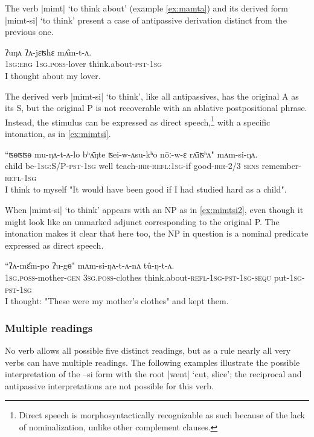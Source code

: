 \documentclass[twoside,a4paper,11pt]{article}
\newcommand{\ipa}[1]{{\phon#1}}
\begin{document}
The verb |\ipa{mimt}| `to think about' (example \ref{ex:mamta}) and its derived form |\ipa{mimt-si}| `to think' present a case of antipassive derivation distinct from the previous one. 

\begin{exe}
\ex \label{ex:mamta}
\gll
\ipa{ʔuŋʌ} 	\ipa{ʔʌ-jɛʦhɛ} 	\ipa{mʌ̂m-t-ʌ.} \\
\textsc{1sg:erg} \textsc{1sg.poss}-lover think.about-\textsc{pst-1sg} \\
\glt I thought about my lover.
\end{exe}

The derived verb |\ipa{mimt-si}| `to think', like all antipassives, has the original A as its S, but the original P is not recoverable with an ablative postpositional phrase. Instead, the stimulus can be expressed as direct speech,\footnote{Direct speech is morphosyntactically recognizable as such because of the lack of nominalization, unlike other complement clauses.} with a specific intonation, as in \ref{ex:mimtsi}.

\begin{exe}
\ex \label{ex:mimtsi}
\gll ``\ipa{ʦɵʦʦɵ}  	\ipa{mu-ŋʌ-t-ʌ-lo}  	\ipa{bʰʌ̄ŋte}  	\ipa{ʦei-w-ʌsu-kʰo}  	\ipa{nōː-w-ɛ}  	\ipa{rʌ̄iʦʰʌ}"  	\ipa{mʌm-si-ŋʌ.}  \\
child be-\textsc{1sg:S/P-pst-1sg} well teach-\textsc{irr-refl:1sg}-if good-\textsc{irr-2/3} \textsc{sens} remember-\textsc{refl-1sg} \\
\glt  I think to myself "It would have been good if I had studied hard as a child".
\end{exe}

When |\ipa{mimt-si}| `to think' appears with an NP as in  \ref{ex:mimtsi2}, even though it might look like an unmarked adjunct corresponding to the original P. The intonation makes it clear that here too, the NP in question is a nominal predicate expressed as direct speech.

\begin{exe}
\ex \label{ex:mimtsi2}
\gll 
``\ipa{ʔʌ-mɛ̂m-po} 	\ipa{ʔu-gɵ}" 	\ipa{mʌm-si-ŋʌ-t-ʌ-nʌ} 	\ipa{tû-ŋ-t-ʌ.}
 \\
 \textsc{1sg.poss}-mother-\textsc{gen} \textsc{3sg.poss}-clothes think.about-\textsc{refl-1sg-pst-1sg-sequ} put-\textsc{1sg-pst-1sg} \\
\glt I thought: "These were my mother's clothes" and kept them.
\end{exe}
 
 
  
 
 \subsubsection{Multiple readings}  
No verb allows all possible five distinct readings, but as a rule nearly all very verbs can have multiple readings. The following examples illustrate the possible interpretation of the \ipa{--si} form with the root |\ipa{went}| `cut, slice'; the reciprocal and antipassive interpretations are not possible for this verb.
\end{document}
